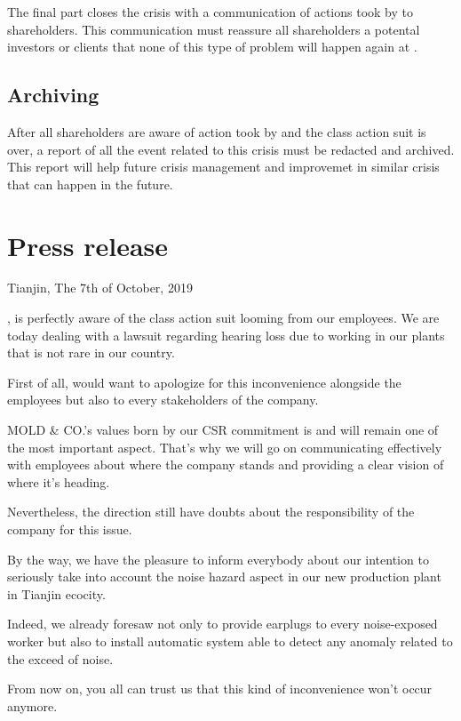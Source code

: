 The final part closes the crisis with a communication of actions took by \moldco to shareholders.
This communication must reassure all shareholders a potental investors or clients that none of this type of problem will happen again at \moldco.

\subsection{Archiving}

After all shareholders are aware of action took by \moldco and the class action suit is over, a report of all the event related to this crisis must be redacted and archived.
This report will help future crisis management and improvemet in similar crisis that can happen in the future.

\section{Press release}
\label{press-release}

\bigskip

Tianjin, The 7th of October, 2019 

\bigskip

\moldco, is perfectly aware of the class action suit looming from our employees. We are today dealing with a lawsuit regarding hearing loss due to working in our plants that is not rare in our country. 

First of all, \moldco would want to apologize for this inconvenience alongside the employees but also to every stakeholders of the company. 

MOLD \& CO.’s values born by our CSR commitment is and will remain one of the most important aspect. That’s why we will go on communicating effectively with employees about where the company stands and providing a clear vision of where it’s heading. 

Nevertheless, the direction still have doubts about the responsibility of the company for this issue. 

By the way, we have the pleasure to inform everybody about our intention to seriously take into account the noise hazard aspect in our new production plant in Tianjin ecocity. 

Indeed, we already foresaw not only to provide earplugs to every noise-exposed worker but also to install automatic system able to detect any anomaly related to the exceed of noise. 

From now on, you all can trust us that this kind of inconvenience won’t occur anymore. 

